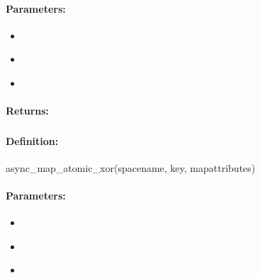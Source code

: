 \paragraph{Parameters:}
\begin{itemize}[noitemsep]
\item {}\\

\item {}\\

\item {}\\

\end{itemize}

\paragraph{Returns:}


\pagebreak
\subsubsection{}
\label{api:ruby:async_map_atomic_xor}


\paragraph{Definition:}
\begin{rubycode}
async_map_atomic_xor(spacename, key, mapattributes)
\end{rubycode}

\paragraph{Parameters:}
\begin{itemize}[noitemsep]
\item {}\\

\item {}\\

\item {}\\

\end{itemize}

